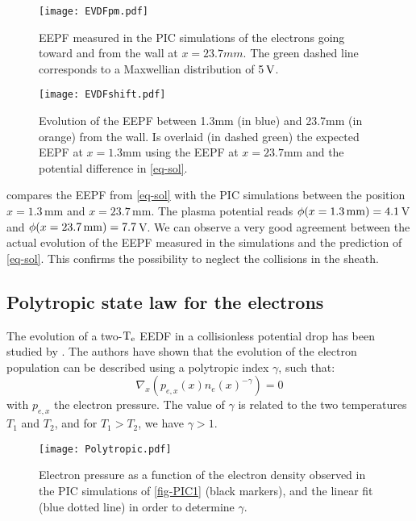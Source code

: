     \begin{figure}[!hbtp]
      \centering
      \texttt{[image: EVDFpm.pdf]}
      \caption{EEPF measured in the PIC simulations of the electrons going toward and from the wall at $x=23.7mm$. The green dashed line corresponds to a Maxwellian distribution of 5${\mathrm{\,V}}$.}
      \label{fig-EVDFpm}
    \end{figure}

    \begin{figure}[!hbtp]
      \centering
      \texttt{[image: EVDFshift.pdf]}
      \caption{Evolution of the EEPF between 1.3mm (in blue) and 23.7mm (in orange) from the wall. Is overlaid (in dashed green) the expected  EEPF at $x=1.3$mm using the EEPF at $x=23.7$mm and the potential difference in \cref{eq-sol}. }
      \label{fig-PICEEPF}
    \end{figure}

     compares the EEPF from \cref{eq-sol} with the \ac{PIC} simulations between the position $x=1.3$\,mm and $x=23.7$\,mm.
    The plasma potential reads $\phi(x=1.3\,{\rm mm})=4.1$\,V and  $\phi(x=23.7\,{\rm mm})=7.7$\,V.
    We can observe a very good agreement between the actual evolution of the EEPF measured in the simulations and the prediction of \cref{eq-sol}.
    This confirms the possibility to neglect the collisions in the sheath.

  \subsection{Polytropic state law for the electrons}

    The evolution of a two-$\mathrm{T_e}$ EEDF  in a collisionless potential drop has been studied by \citet{zhang2016}.
    The authors have shown that the evolution of the electron population can be described using a polytropic index $\gamma$, such that\string:
    \begin{equation}
      \label{eq-poly}
      \nabla_x \left( p_{e,x}(x) n_e(x)^{-\gamma} \right)= 0
    \end{equation}
    with $p_{e,x}$ the electron pressure.
    The value of $\gamma$ is related to the two temperatures $T_1$ and $T_2$, and for $T_1 > T_2$, we have $\gamma > 1 $.




    \begin{figure}[!htbp]
      \centering
      \texttt{[image: Polytropic.pdf]}
      \caption{Electron pressure as a function of the electron density observed in the PIC simulations of \cref{fig-PIC1} (black markers), and the linear fit (blue dotted line) in order to determine $\gamma$.}
      \label{fig-polyFit}
    \end{figure}

